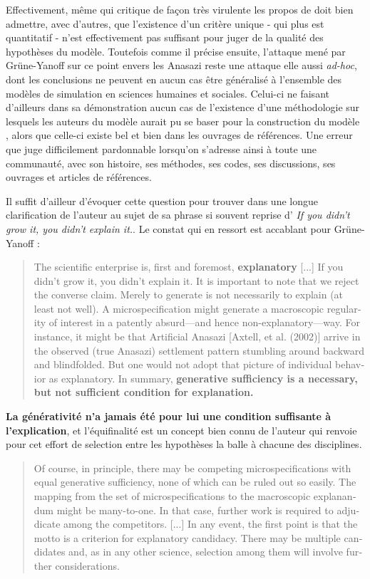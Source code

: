 Effectivement, même \textcite{Chattoe2011} qui critique de façon très virulente les propos de \textcite{Yanoff2008} doit bien admettre, avec d'autres, que l'existence d'un critère unique - qui plus est quantitatif - n'est effectivement pas suffisant pour juger de la qualité des hypothèses du modèle. Toutefois comme il précise ensuite, l'attaque mené par Grüne-Yanoff sur ce point envers les Anasazi reste une attaque elle aussi \textit{ad-hoc}, dont les conclusions ne peuvent en aucun cas être généralisé à l'ensemble des modèles de simulation en sciences humaines et sociales. Celui-ci ne faisant d'ailleurs dans sa démonstration aucun cas de l'existence d'une méthodologie sur lesquels les auteurs du modèle aurait pu se baser pour la construction du modèle , alors que celle-ci existe bel et bien dans les ouvrages de références. Une erreur que \textcite{Chattoe2011} juge difficilement pardonnable lorsqu'on s'adresse ainsi à toute une communauté, avec son histoire, ses méthodes, ses codes, ses discussions, ses ouvrages et articles de références. 

Il suffit d'ailleur d'évoquer cette question pour trouver dans \textcite{Epstein2006} une longue clarification de l'auteur au sujet de sa phrase si souvent reprise d'\textcite{Epstein1999} \textit{If you didn’t grow it, you didn’t explain it.}. Le constat qui en ressort est accablant pour Grüne-Yanoff : 

\foreignblockquote{english}[\cite{Epstein2006}]{The scientific enterprise is, first and foremost, \textbf{explanatory} [...] If you didn’t grow it, you didn’t explain it. It is important to note that we reject the converse claim. Merely to generate is not necessarily to explain (at least not well). A microspecification might generate a macroscopic regularity of interest in a patently absurd—and hence non-explanatory—way. For instance, it might be that Artificial Anasazi [Axtell, et al. (2002)] arrive in the observed (true Anasazi) settlement pattern stumbling around backward and blindfolded. But one would not adopt that picture of individual behavior as explanatory. In summary, \textbf{generative sufficiency is a necessary, but not sufficient condition for explanation.}} 

\textbf{La générativité n'a jamais été pour lui une condition suffisante à l'explication}, et l'équifinalité est un concept bien connu de l'auteur qui renvoie pour cet effort de selection entre les hypothèses la balle à chacune des disciplines. 

\foreignblockquote{english}[\cite{Epstein2006}]{Of course, in principle, there may be competing microspecifications with equal generative sufficiency, none of which can be ruled out so easily. The mapping from the set of microspecifications to the macroscopic explanandum might be many-to-one. In that case, further work is required to adjudicate among the competitors. [...] In any event, the first point is that the motto is a criterion for explanatory candidacy. There may be multiple candidates and, as in any other science, selection among them will involve further considerations.} 

